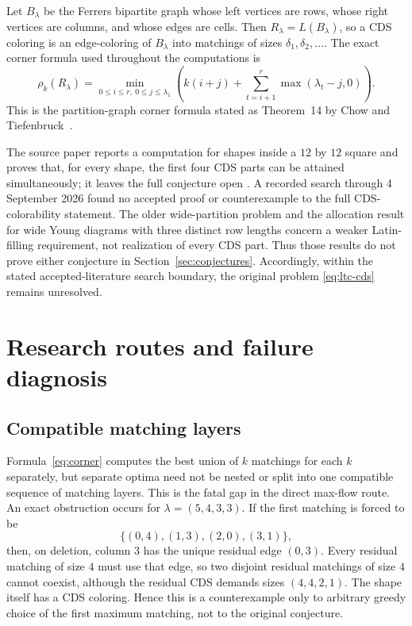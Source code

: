 \documentclass[11pt]{amsart}
\theoremstyle{definition}
\begin{document}
Let $B_\lambda$ be the Ferrers bipartite graph whose left vertices are rows,
whose right vertices are columns, and whose edges are cells.  Then
$R_\lambda=L(B_\lambda)$, so a CDS coloring is an edge-coloring of
$B_\lambda$ into matchings of sizes $\delta_1,\delta_2,\ldots$.
The exact corner formula used throughout the computations is
\begin{equation}
 \rho_k(R_\lambda)=
 \min_{0\leq i\leq r,\ 0\leq j\leq\lambda_1}
 \left(k(i+j)+\sum_{t=i+1}^{r}\max(\lambda_t-j,0)\right).
 \label{eq:corner}
\end{equation}
This is the partition-graph corner formula stated as Theorem~14 by
Chow and Tiefenbruck~\cite{ChowTiefenbruck2025}.

The source paper reports a computation for shapes inside a $12$ by $12$
square and proves that, for every shape, the first four CDS parts can be
attained simultaneously; it leaves the full conjecture open
\cite{ChowTiefenbruck2025}.  A recorded search through 4 September 2026
found no accepted proof or counterexample to the full CDS-colorability
statement.  The older wide-partition problem
\cite{ChowFanGoemansVondrak2003} and the allocation result for wide Young
diagrams with three distinct row lengths
\cite{AllsopKotlarWanless2025} concern a weaker Latin-filling requirement,
not realization of every CDS part.  Thus those results do not prove either
conjecture in Section~\ref{sec:conjectures}.  Accordingly, within the stated
accepted-literature search boundary, the original problem
\eqref{eq:ltc-cds} remains unresolved.

\section{Research routes and failure diagnosis}

\subsection{Compatible matching layers}

Formula~\eqref{eq:corner} computes the best union of $k$ matchings for each
$k$ separately, but separate optima need not be nested or split into one
compatible sequence of matching layers.  This is the fatal gap in the direct
max-flow route.  An exact obstruction occurs for
$\lambda=(5,4,3,3)$.  If the first matching is forced to be
\[
 \{(0,4),(1,3),(2,0),(3,1)\},
\]
then, on deletion, column $3$ has the unique residual edge $(0,3)$.
Every residual matching of size $4$ must use that edge, so two disjoint
residual matchings of size $4$ cannot coexist, although the residual CDS
demands sizes $(4,4,2,1)$.  The shape itself has a CDS coloring.  Hence this
is a counterexample only to arbitrary greedy choice of the first maximum
matching, not to the original conjecture.
\end{document}
